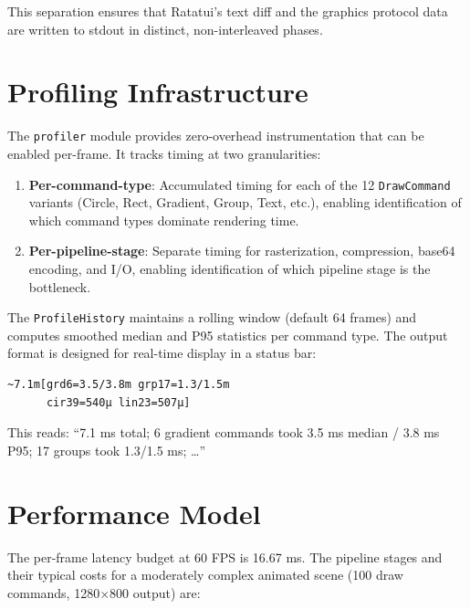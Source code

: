 \documentclass[11pt, a4paper, twocolumn]{article}
\begin{document}
This separation ensures that Ratatui's text diff and the graphics protocol data are written to stdout in distinct, non-interleaved phases.

\section{Profiling Infrastructure}
\label{sec:profiling}

The \texttt{profiler} module provides zero-overhead instrumentation that can be enabled per-frame.
It tracks timing at two granularities:

\begin{enumerate}[leftmargin=1.5em, itemsep=0.1em]
    \item \textbf{Per-command-type}: Accumulated timing for each of the 12 \texttt{DrawCommand} variants (Circle, Rect, Gradient, Group, Text, etc.), enabling identification of which command types dominate rendering time.
    \item \textbf{Per-pipeline-stage}: Separate timing for rasterization, compression, base64 encoding, and I/O, enabling identification of which pipeline stage is the bottleneck.
\end{enumerate}

The \texttt{ProfileHistory} maintains a rolling window (default 64 frames) and computes smoothed median and P95 statistics per command type.
The output format is designed for real-time display in a status bar:

\begin{verbatim}
~7.1m[grd6=3.5/3.8m grp17=1.3/1.5m
      cir39=540µ lin23=507µ]
\end{verbatim}

This reads: ``7.1 ms total; 6 gradient commands took 3.5 ms median / 3.8 ms P95; 17 groups took 1.3/1.5 ms; \ldots''

\section{Performance Model}
\label{sec:performance}

The per-frame latency budget at 60 FPS is 16.67 ms.
The pipeline stages and their typical costs for a moderately complex animated scene (100 draw commands, 1280$\times$800 output) are:
\end{document}
